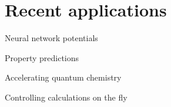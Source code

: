 \section{Recent applications}
\begin{frame}[t]{Neural network potentials}

\end{frame}
\begin{frame}[t]{Property predictions}

\end{frame}
\begin{frame}[t]{Accelerating quantum chemistry}

\end{frame}
\begin{frame}[t]{Controlling calculations on the fly}

\end{frame}
